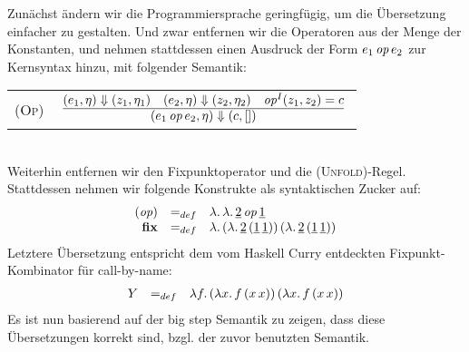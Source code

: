 \documentclass[12pt,fleqn,a4paper]{article}
\newcommand{\RN}[1]{\mbox{\textsc{(#1)}}}
\begin{document}
Zun\"achst \"andern wir die Programmiersprache geringf\"ugig, um die \"Ubersetzung einfacher zu gestalten. Und
zwar entfernen wir die Operatoren aus der Menge der Konstanten, und nehmen stattdessen einen Ausdruck der
Form $e_1\,{\text{\it op\/}}\,e_2$ zur Kernsyntax hinzu, mit folgender Semantik: \\[5mm]
\begin{tabular}{ll}
  \RN{Op} & $\regel{(e_1,\eta) \Downarrow (z_1,\eta_1) \quad (e_2,\eta) \Downarrow (z_2,\eta_2)
                    \quad \op^I(z_1,z_2)=c}
                   {(e_1\,\op\,e_2,\eta) \Downarrow (c,[])}$
\end{tabular} \\[5mm]
Weiterhin entfernen wir den Fixpunktoperator und die \RN{Unfold}-Regel. Stattdessen nehmen wir folgende
Konstrukte als syntaktischen Zucker auf:
\[\begin{array}{rcl}
  ({\text{\it op\/}}) &=_{def}& \lambda .\,\lambda .\,\underline{2}\,{\text{\it op\/}}\,\underline{1} \\
  \mathbf{fix} &=_{def}& \lambda .\,(\lambda .\,\underline{2}\,(\underline{1}\,\underline{1}))\,(\lambda .\,\underline{2}\,(\underline{1}\,\underline{1}))
\end{array}\]
Letztere \"Ubersetzung entspricht dem vom Haskell Curry entdeckten Fixpunkt-Kombinator f\"ur call-by-name:
\[\begin{array}{rcl}
  Y &=_{def}& \lambda f.\,(\lambda x.\,f\,(x\,x))\,(\lambda x.\,f\,(x\,x))
\end{array}\]
Es ist nun basierend auf der big step Semantik zu zeigen, dass diese \"Ubersetzungen korrekt sind, bzgl. der
zuvor benutzten Semantik.
\end{document}
